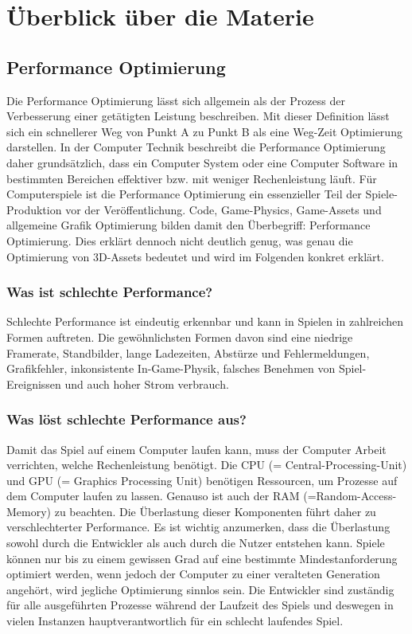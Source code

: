 \chapter{Überblick über die Materie}

\section{Performance Optimierung}

Die Performance Optimierung lässt sich allgemein als der Prozess der Verbesserung einer getätigten Leistung beschreiben. Mit dieser Definition lässt sich ein schnellerer Weg von Punkt A zu Punkt B als eine Weg-Zeit Optimierung darstellen. In der Computer Technik beschreibt die Performance Optimierung daher grundsätzlich, dass ein Computer System oder eine Computer Software in bestimmten Bereichen effektiver bzw. mit weniger Rechenleistung läuft. Für Computerspiele ist die Performance Optimierung ein essenzieller Teil der Spiele-Produktion vor der Veröffentlichung. Code, Game-Physics, Game-Assets und allgemeine Grafik Optimierung bilden damit den Überbegriff: Performance Optimierung. Dies erklärt dennoch nicht deutlich genug, was genau die Optimierung von 3D-Assets bedeutet und wird im Folgenden konkret erklärt.\cite[648]{_advances}

\subsection{Was ist schlechte Performance?}

Schlechte Performance ist eindeutig erkennbar und kann in Spielen in zahlreichen Formen auftreten. Die gewöhnlichsten Formen davon sind eine niedrige Framerate, Standbilder, lange Ladezeiten, Abstürze und Fehlermeldungen, Grafikfehler, inkonsistente In-Game-Physik, falsches Benehmen von Spiel-Ereignissen und auch hoher Strom verbrauch.

\subsection{Was löst schlechte Performance aus?}

Damit das Spiel auf einem Computer laufen kann, muss der Computer Arbeit verrichten, welche Rechenleistung benötigt. Die CPU (= Central-Processing-Unit) und GPU (= Graphics Processing Unit) benötigen Ressourcen, um Prozesse auf dem Computer laufen zu lassen. Genauso ist auch der RAM (=Random-Access-Memory) zu beachten. Die Überlastung dieser Komponenten führt daher zu verschlechterter Performance. Es ist wichtig anzumerken, dass die Überlastung sowohl durch die Entwickler als auch durch die Nutzer entstehen kann.\cite[17]{_unity_game_optimization} Spiele können nur bis zu einem gewissen Grad auf eine bestimmte Mindestanforderung optimiert werden, wenn jedoch der Computer zu einer veralteten Generation angehört, wird jegliche Optimierung sinnlos sein. Die Entwickler sind zuständig für alle ausgeführten Prozesse während der Laufzeit des Spiels und deswegen in vielen Instanzen hauptverantwortlich für ein schlecht laufendes Spiel.

